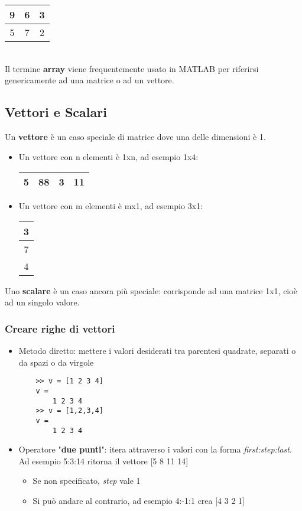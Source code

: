 \documentclass[a4paper, 10pt]{article}
\begin{document}
\begin{tabular}{|c|c|c|}
\hline
9 & 6 & 3 \\ \hline
5 & 7 & 2 \\ \hline
\end{tabular} \bigskip \\
Il termine \textbf{array} viene frequentemente usato in MATLAB per riferirsi genericamente ad una matrice o ad un vettore.

\subsection{Vettori e Scalari}
Un \textbf{vettore} è un caso speciale di matrice dove una delle dimensioni è 1.

\begin{itemize}

	\item Un vettore con n elementi è 1xn, ad esempio 1x4:
		\begin{tabular}{|c|c|c|c|}
		\hline
		5 & 88 & 3 & 11 \\ \hline
		\end{tabular} \bigskip
		
	\item Un vettore con m elementi è mx1, ad esempio 3x1:
		\begin{tabular}{|c|}
		\hline
		3 \\ \hline
		7 \\ \hline
		4 \\ \hline
		\end{tabular} \bigskip

\end{itemize}
Uno \textbf{scalare} è un caso ancora più speciale: corrisponde ad una matrice 1x1, cioè ad un singolo valore.

\subsubsection{Creare righe di vettori}
\begin{itemize}
\item Metodo diretto: mettere i valori desiderati tra parentesi quadrate, separati o da spazi o da virgole
	\begin{lstlisting}
	>> v = [1 2 3 4]
	v =
		1 2 3 4
	>> v = [1,2,3,4]
	v =
		1 2 3 4
	\end{lstlisting}
\item Operatore "\textbf{due punti}": itera attraverso i valori con la forma \emph{first:step:last}. \\ Ad esempio 5:3:14 ritorna il vettore [5 8 11 14]
	\begin{itemize}
	\item Se non specificato, \textit{step} vale 1
	\item Si può andare al contrario, ad esempio 4:-1:1 crea [4 3 2 1]
	\end{itemize}
\end{itemize}
\end{document}
